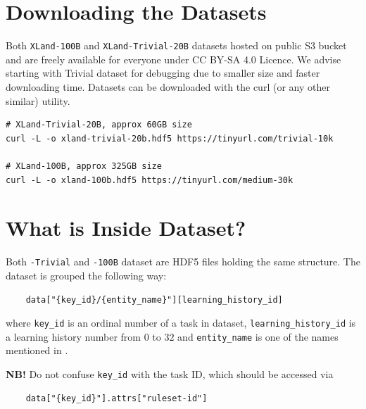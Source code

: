 \documentclass{article}
\begin{document}



\newpage
\appendix
\section{Downloading the Datasets}

Both \texttt{XLand-100B} and \texttt{XLand-Trivial-20B} datasets hosted on public S3 bucket and are freely available for everyone under CC BY-SA 4.0 Licence. We advise starting with Trivial dataset for debugging due to smaller size and faster downloading time. Datasets can be downloaded with the curl (or any other similar) utility.

\begin{verbatim}
# XLand-Trivial-20B, approx 60GB size
curl -L -o xland-trivial-20b.hdf5 https://tinyurl.com/trivial-10k

# XLand-100B, approx 325GB size
curl -L -o xland-100b.hdf5 https://tinyurl.com/medium-30k
\end{verbatim}

\section{What is Inside Dataset?}
\label{apndx:data-explanation}
Both \texttt{-Trivial} and \texttt{-100B} dataset are HDF5 files holding the same structure. The dataset is grouped the following way: 
\begin{verbatim}
    data["{key_id}/{entity_name}"][learning_history_id]
\end{verbatim}

where \texttt{key\_id} is an ordinal number of a task in dataset, \texttt{learning\_history\_id} is a learning history number from $0$ to $32$ and \texttt{entity\_name} is one of the names mentioned in .  

\textbf{NB!} Do not confuse \texttt{key\_id} with the task ID, which should be accessed via 
\begin{verbatim}
    data["{key_id}"].attrs["ruleset-id"]
\end{verbatim}
\end{document}
